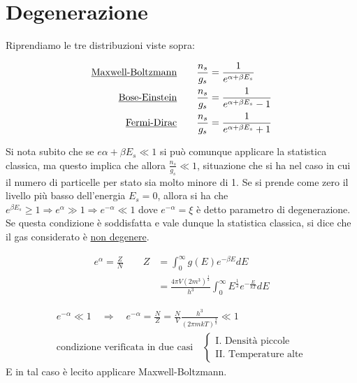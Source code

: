 
\section{Degenerazione}

Riprendiamo le tre distribuzioni viste sopra:

\begin{equation}
\begin{split}
\mbox{\underline{Maxwell-Boltzmann}}  \quad\quad  \frac{n_s}{g_s} & = \frac{1}{e^{\alpha + \beta E_s}} \\
\mbox{\underline{Bose-Einstein}}  \quad\quad  \frac{n_s}{g_s} & = \frac{1}{e^{\alpha + \beta E_s} - 1} \\
\mbox{\underline{Fermi-Dirac}}  \quad\quad  \frac{n_s}{g_s} & = \frac{1}{e^{\alpha + \beta E_s} + 1 } 
\end{split}
\end{equation}

Si nota subito che se $e{\alpha + \beta E_s} \ll 1 $ si può comunque applicare la statistica classica, ma questo implica che allora  $\frac{n_s}{g_s} \ll 1 $,
situazione che si ha nel caso in cui il numero di particelle per stato sia molto minore di 1.
Se si prende come zero il livello più basso dell'energia $E_s = 0$, allora si ha che $e^{\beta E_s } \ge 1 \Rightarrow e^{\alpha} \gg 1 \Rightarrow e^{-\alpha} \ll 1$
dove $e^{-\alpha} = \xi $ è detto parametro di degenerazione.
Se questa condizione è soddisfatta e vale dunque la statistica classica, si dice che il gas considerato è \underline{non degenere}. 

\begin{equation}
\begin{split}
e^{\alpha} = \frac{Z}{N} \quad\quad Z & = \int_0^{\infty} g(E) e^{-\beta E} dE \\
& = \frac{4 \pi V (2m^3)^\frac{1}{2}}{h^3} \int_0^{\infty} E^{\frac{1}{2}} e^{-\frac{E}{kT}} dE
\end{split}
\end{equation}

\begin{equation}
\begin{split}
e^{-\alpha} \ll 1 \quad \Rightarrow \quad e^{-\alpha} = \frac{N}{Z} = \frac{N}{V} \frac{h^3}{(2 \pi m k T)^{\frac{3}{2}}} \ll 1 \\
\mbox{condizione verificata in due casi} \quad
\begin{cases} 
	\mbox{I.  Densità piccole} \\
	\mbox{II. Temperature alte}
\end{cases}
\end{split}
\end{equation}
E in tal caso è lecito applicare Maxwell-Boltzmann.


